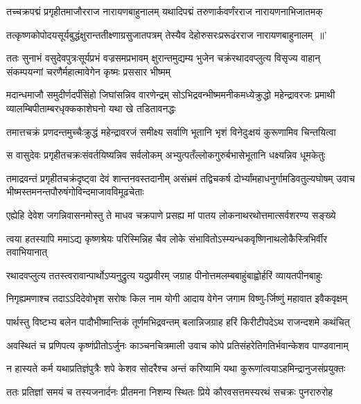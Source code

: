 \twolineshloka
{तच्चक्रपद्मं प्रगृहीतमाजौरराज नारायणबाहुनालम्}
{यथादिपद्मं तरुणार्कवर्णंरराज नारायणनाभिजातमक्}


\twolineshloka
{तत्कृष्णकोपोदयसूर्यबुद्धंक्षुरान्ततीक्ष्णाग्रसुजातपत्रम्}
{तेस्यैव देहोरुसरःप्ररूढंरराज नारायणबाहुनालम् ॥'}


\threelineshloka
{ततः सुनाभं वसुदेवपुत्रःसूर्यप्रभं वज्रसमप्रभावम्}
{क्षुरान्तमुद्यम्य भुजेन चक्रंरथादवप्लुत्य विसृज्य वाहान्}
{संकम्पयन्गां चरणैर्महात्मावेगेन कृष्मः प्रससार भीष्मम्}


\threelineshloka
{मदान्धमाजौ समुदीर्णदर्पंसिंहो जिघांसन्निव वारणेन्द्रम्}
{सोऽभिद्रवन्भीष्ममनीकमध्येक्रुद्धो महेन्द्रावरजः प्रमाथी}
{व्यालम्बिपीताम्बरधृक्ककाशेघनो यथा खे तडितावनद्धः}


\twolineshloka
{तमात्तचक्रं प्रणदन्तमुच्चैःक्रुद्धं महेन्द्रावरजं समीक्ष्य}
{सर्वाणि भूतानि भृशं विनेदुःक्षयं कुरूणामिव चिन्तयित्वा}


\twolineshloka
{स वासुदेवः प्रगृहीतचक्रःसंवर्तयिष्यन्निव सर्वलोकम्}
{अभ्युत्पतँल्लोकगुरुर्बभासेभूतानि धक्ष्यन्निव धूमकेतुः}


\threelineshloka
{तमाद्रवन्तं प्रगृहीतचक्रंदृष्ट्वा देवं शान्तनवस्तदानीम्}
{असंभ्रमं तद्विचकर्ष दोर्भ्यांमहाधनुर्गामडिवतुल्यघोषम्}
{उवाच भीष्मस्तमनन्तपौरुषंगोविन्दमाजावविमूढचेताः}


\twolineshloka
{एह्येहि देवेश जगन्निवासनमोस्तु ते माधव चक्रपाणे}
{प्रसह्य मां पातय लोकनाथरथोत्तमात्सर्वशरण्य सङ्ख्ये}


\twolineshloka
{त्वया हतस्यापि ममाऽद्य कृष्णश्रेयः परिस्मिन्निह चैव लोके}
{संभावितोऽस्म्यन्धकवृष्णिनाथलोकैस्त्रिभिर्वीर तवाभियानात्}


\twolineshloka
{रथादवप्लुत्य ततस्त्वरावान्पार्थोऽप्यनुद्रुत्य यदुप्रवीरम्}
{जग्राह पीनोत्तमलम्बबाहुंबाह्वोर्हरिं व्यायतपीनबाहुः}


\twolineshloka
{निगृह्यमणाश्च तदाऽऽदिदेवोभृश सरोषः किल नाम योगी}
{आदाय वेगेन जगाम विष्णु-र्जिष्णुं महावात इवैकवृक्षम्}


\twolineshloka
{पार्थस्तु विष्टभ्य बलेन पादौभीष्मान्तिकं तूर्णमभिद्रवन्तम्}
{बलान्निजग्राह हरिं किरीटीपदेऽथ राजन्दशमे कथंचित्}


\twolineshloka
{अवस्थितं च प्रणिपत्य कृष्णंप्रीतोऽर्जुनः काञ्चनचित्रमाली}
{उवाच कोपे प्रतिसंहरेतिगतिर्भवान्केशव पाण्डवानाम्}


\twolineshloka
{न हास्यते कर्म यथाप्रतिज्ञंपुत्रैः शपे केशव सोदरैश्च}
{अन्तं करिष्यामि यथा कुरूणांत्वयाऽहमिन्द्रानुजसंप्रयुक्तः}


\twolineshloka
{ततः प्रतिज्ञां समयं च तस्यजनार्दनः प्रीतमना निशम्य}
{स्थितः प्रिये कौरवसत्तमस्यरथं सचक्रः पुनरारुरोह}



